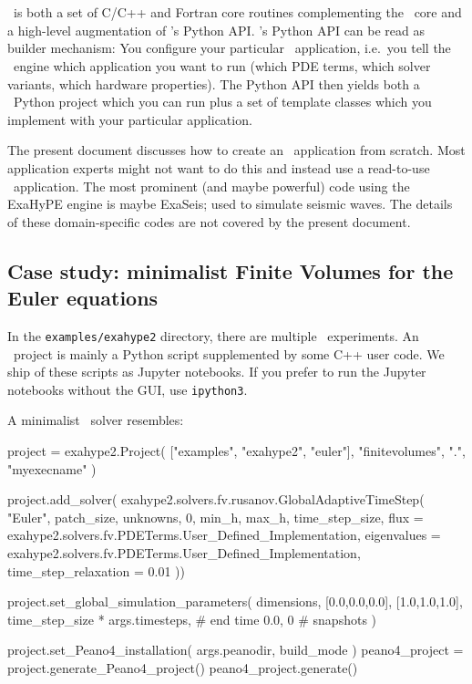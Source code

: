\chapter{\ExaHyPE}
\label{section:exahype}


\ExaHyPE\ is both a set of C/C++ and Fortran core routines complementing the
\Peano\ core and a high-level augmentation of \Peano's Python API.
\ExaHyPE's Python API can be read as builder mechanism:
You configure your particular \ExaHyPE\ application, i.e.~you tell the \ExaHyPE\
engine which application you want to run (which PDE terms, which solver
variants, which hardware properties).
The Python API then yields both a \Peano\ Python project which you can run plus
a set of template classes which you implement with your particular application.


The present document discusses how to create an \ExaHyPE\ application from
scratch.
Most application experts might not want to do this and instead use a read-to-use
\ExaHyPE\ application.
The most prominent (and maybe powerful) code using the ExaHyPE engine is maybe
ExaSeis; used to simulate seismic waves.
The details of these domain-specific codes are not covered by the present
document.









\section{Case study: minimalist Finite Volumes for the Euler equations}
\label{section:exahype:fv}


\begin{remark}
 In the \texttt{examples/exahype2} directory, there are multiple \ExaHyPE\
 experiments. An \ExaHyPE\ project is mainly a Python script supplemented by
 some C++ user code. We ship of these scripts as Jupyter notebooks. If you prefer to run the Jupyter
 notebooks without the GUI, use \texttt{ipython3}.
\end{remark}


\noindent
A minimalist \ExaHyPE\ solver resembles:
\begin{code}
project = exahype2.Project( ["examples", "exahype2", "euler"], "finitevolumes", ".", "myexecname" )

project.add_solver(  exahype2.solvers.fv.rusanov.GlobalAdaptiveTimeStep(
  "Euler",
  patch_size,
  unknowns, 0,
  min_h, max_h,
  time_step_size,
  flux = exahype2.solvers.fv.PDETerms.User_Defined_Implementation,
  eigenvalues = exahype2.solvers.fv.PDETerms.User_Defined_Implementation,
  time_step_relaxation = 0.01
))

project.set_global_simulation_parameters(
  dimensions, [0.0,0.0,0.0], [1.0,1.0,1.0],
  time_step_size * args.timesteps, # end time
  0.0, 0                           # snapshots
)

project.set_Peano4_installation( args.peanodir, build_mode )
peano4_project = project.generate_Peano4_project()
peano4_project.generate()
\end{code}

